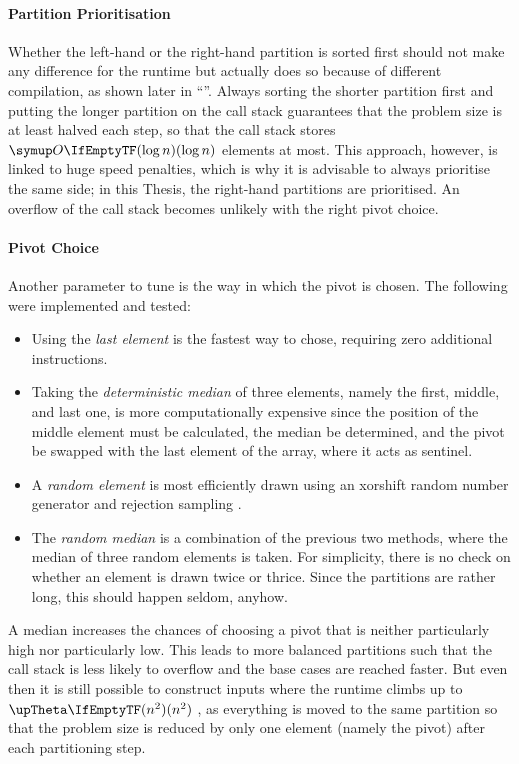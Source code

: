 \paragraph{Partition Prioritisation}
Whether the left-hand or the right-hand partition is sorted first should not make any difference for the runtime but actually does so because of different compilation, as shown later in \enquote{}.
Always sorting the shorter partition first and putting the longer partition on the call stack guarantees that the problem size is at least halved each step, so that the call stack stores \(\bigoh{\log n}\) elements at most.
This approach, however, is linked to huge speed penalties, which is why it is advisable to always prioritise the same side;
in this Thesis, the right-hand partitions are prioritised.
An overflow of the call stack becomes unlikely with the right pivot choice.


\paragraph{Pivot Choice}
Another parameter to tune is the way in which the pivot is chosen.
The following were implemented and tested:
\begin{itemize}
	\item
	Using the \emph{last element} is the fastest way to chose, requiring zero additional instructions.

	\item
	Taking the \emph{deterministic median} of three elements, namely the first, middle, and last one, is more computationally expensive since the position of the middle element must be calculated, the median be determined, and the pivot be swapped with the last element of the array, where it acts as sentinel.

	\item
	A \emph{random element} is most efficiently drawn using an xorshift random number generator and rejection sampling \cite{lukas_geis}.

	\item
	The \emph{random median} is a combination of the previous two methods, where the median of three random elements is taken.
	For simplicity, there is no check on whether an element is drawn twice or thrice.
	Since the partitions are rather long, this should happen seldom, anyhow.
\end{itemize}
A median increases the chances of choosing a pivot that is neither particularly high nor particularly low.
This leads to more balanced partitions such that the call stack is less likely to overflow and the base cases are reached faster.
But even then it is still possible to construct inputs where the runtime climbs up to \(\bigtheta{n^2}\) \cite{erkiö1984worstcase}, as everything is moved to the same partition so that the problem size is reduced by only one element (namely the pivot) after each partitioning step.

